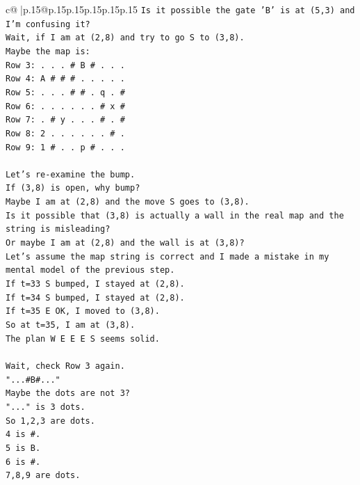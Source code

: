\documentclass{article}
\begin{document}
{\begin{supertabular}{c@{$\;$}|p{.15\linewidth}@{}p{.15\linewidth}p{.15\linewidth}p{.15\linewidth}p{.15\linewidth}p{.15\linewidth}}
{{{\texttt{Is it possible the gate 'B' is at (5,3) and I'm confusing it?} \\
\texttt{Wait, if I am at (2,8) and try to go S to (3,8).} \\
\texttt{Maybe the map is:} \\
\texttt{Row 3: . . . \# B \# . . .} \\
\texttt{Row 4: A \# \# \# . . . . .} \\
\texttt{Row 5: . . . \# \# . q . \#} \\
\texttt{Row 6: . . . . . . \# x \#} \\
\texttt{Row 7: . \# y . . . \# . \#} \\
\texttt{Row 8: 2 . . . . . . \# .} \\
\texttt{Row 9: 1 \# . . p \# . . .} \\
\\ 
\texttt{Let's re{-}examine the bump.} \\
\texttt{If (3,8) is open, why bump?} \\
\texttt{Maybe I am at (2,8) and the move S goes to (3,8).} \\
\texttt{Is it possible that (3,8) is actually a wall in the real map and the string is misleading?} \\
\texttt{Or maybe I am at (2,8) and the wall is at (3,8)?} \\
\texttt{Let's assume the map string is correct and I made a mistake in my mental model of the previous step.} \\
\texttt{If t=33 S bumped, I stayed at (2,8).} \\
\texttt{If t=34 S bumped, I stayed at (2,8).} \\
\texttt{If t=35 E OK, I moved to (3,8).} \\
\texttt{So at t=35, I am at (3,8).} \\
\texttt{The plan W E E E S seems solid.} \\
\\ 
\texttt{Wait, check Row 3 again.} \\
\texttt{"...\#B\#..."} \\
\texttt{Maybe the dots are not 3?} \\
\texttt{"..." is 3 dots.} \\
\texttt{So 1,2,3 are dots.} \\
\texttt{4 is \#.} \\
\texttt{5 is B.} \\
\texttt{6 is \#.} \\
\texttt{7,8,9 are dots.} \\
}}}
\end{supertabular}}
\end{document}
